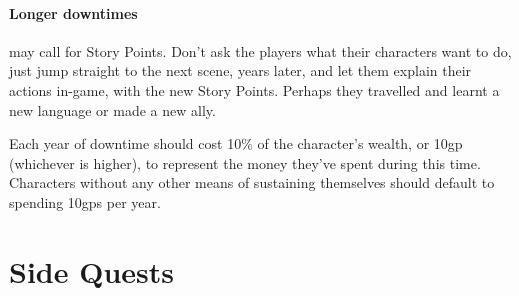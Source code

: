 \begin{multicols}{2}

\paragraph{Longer downtimes}
may call for Story Points.
Don't ask the players what their characters want to do, just jump straight to the next scene, years later, and let them explain their actions in-game, with the new Story Points.
Perhaps they travelled and learnt a new language or made a new ally.

Each year of downtime should cost 10\% of the character's wealth, or 10\gls{gp} (whichever is higher), to represent the money they've spent during this time.
Characters without any other means of sustaining themselves should default to spending 10\glspl{gp} per year.

\end{multicols}

\section{Side Quests}\label{sidequests}

